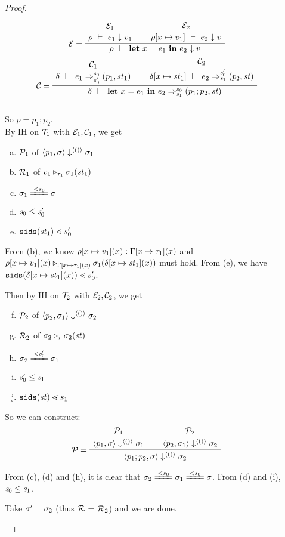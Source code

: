 \begin{proof}
\begin{itemize}
 $$\PT{	
 	\UCN{\ME_1}{\Eval{\rho}{e_1}{v_1}}
 	\UCN{\ME_2}{\Eval{\rho[\Map{x}{v_1}]}{e_2}{v}}
 	\LeLa{\ME =} 
 	\BC{\Eval{\rho}{\Let{x}{e_1}{e_2}}{v}}
 }$$ 
 $$\PT{\UCN{\MC_1}{\Trans{\del}{e_1}{\s_0}{\s_0'}{\sfun{p_1}{\st_1}}}
 	\UCN{\MC_2}{\Trans{\del[x \|-> {\st_1}]}{e_2}{\s_0'}{\s_1}{\sfun {p_2} {\st}}}
 	\LeLa{\MC = }
 	\BC{\Trans{\del}{\Let{x}{e_1}{e_2}}{\s_0}{\s_1}{\sfun {p_1;p_2} {\st}}}
 }$$\\[1ex]
 
 So $p = p_1;p_2$. \\
 
 By IH on $\mathcal{T}_1$ with $\mathcal{E}_1,\mathcal{C}_1$, we get 
 \begin{enumerate}[(a)]
 	\item $\mathcal{P}_1$ of $\langle p_1,\sigma \rangle \downarrow^{\langle () \rangle} \sigma_1$
 	\item $\mathcal{R}_1$ of $v_1 \triangleright_{\tau_1} \sigma_1(\mathit{st}_1)$
 	\item $\sgm_1 \ConEq{s_0} \sgm$ 
 	\item $\mathit{s}_0 \le \mathit{s}_0'$
 	\item $\sids{\st_1} \.< {s_0'}$
 \end{enumerate}
 
  From (b), we know $\rho[x \mapsto v_1](x) : \Gamma[x \mapsto \tau_1](x)$ and  $\rho[x \mapsto v_1](x) \triangleright_{\Gamma[x \mapsto \tau_1](x)} \sigma_1(\delta[x \mapsto \mathit{st}_1](x))$ must hold. 
  From (e), we have $\sids{\delta[\Map{x}{\st_1}](x)} \.< s_0'$. 
 
 Then by IH on  $\mathcal{T}_2$ with $\mathcal{E}_2,\mathcal{C}_2$, we get
 \begin{enumerate}	[(a)]
 	\setcounter{enumi}{5}
 	\item $\mathcal{P}_2$ of $\langle p_2,\sigma_1 \rangle \downarrow^{\langle () \rangle} \sigma_2$ 
 	\item $\mathcal{R}_2$ of $ \sigma_2 \triangleright_{\tau} \sigma_2(\mathit{st})$
    \item $\sgm_2 \ConEq{\s_0'} \sgm_1$
    \item $\mathit{s}_0' \le \mathit{s}_1$
    \item $\sids{\st} \.< {s_1}$
\end{enumerate}

 So we can construct:  
 $$\PT{
 	\UCN{\MP_1}{\seval{p_1}{\sgm}{\vunit}{\sgm_1}}
 	\UCN{\MP_2}{\seval{p_2}{\sgm_1}{\vunit}{\sgm_2}}
 	\LeLa{\MP = }	
 	\BC{\seval{p_1;p_2}{\sgm}{\vunit}{\sgm_2}}
 }$$

 From (c), (d) and (h), it is clear that $\sgm_2 \ConEq{s_0} \sgm_1 \ConEq{s_0} \sgm$.
 From (d) and (i), $\mathit{s}_0 \le \mathit{s}_1$.
 
 Take $\sigma' = \sigma_2$ (thus $\mathcal{R}$ = $\mathcal{R}_2$)  and we are done. 
 

\end{itemize}
\end{proof}
